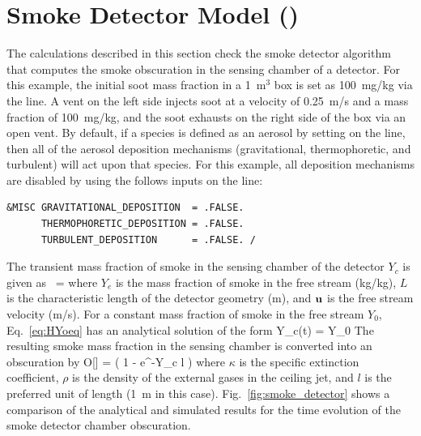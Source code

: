 \documentclass[11pt]{book}
\begin{document}
\clearpage

\section{Smoke Detector Model (\texorpdfstring{}{smoke\_detector}) }
\label{smoke_detector}

The calculations described in this section check the smoke detector algorithm that computes the smoke obscuration in the sensing chamber of a detector. For this example, the initial soot mass fraction in a 1~m$^3$ box is set as 100~mg/kg via the  line. A vent on the left side injects soot at a velocity of 0.25~m/s and a mass fraction of 100~mg/kg, and the soot exhausts on the right side of the box via an open vent. By default, if a species is defined as an aerosol by setting  on the  line, then all of the aerosol deposition mechanisms (gravitational, thermophoretic, and turbulent) will act upon that species. For this example, all deposition mechanisms are disabled by using the follows inputs on the  line:

\begin{lstlisting}
&MISC GRAVITATIONAL_DEPOSITION  = .FALSE.
      THERMOPHORETIC_DEPOSITION = .FALSE.
      TURBULENT_DEPOSITION      = .FALSE. /
\end{lstlisting}

\noindent The transient mass fraction of smoke in the sensing chamber of the detector $Y_c$ is given as~\cite{FDS_Tech_Guide}
\be
{} =  \label{eq:HYoeq}
\ee
where $Y_e$ is the mass fraction of smoke in the free stream (kg/kg), $L$ is the characteristic length of the detector geometry (m), and ${\mathbf{u}}$ is the free stream velocity (m/s). For a constant mass fraction of smoke in the free stream $Y_0$, Eq.~\ref{eq:HYoeq} has an analytical solution of the form
\be
Y_c(t) = Y_0 
\ee
The resulting smoke mass fraction in the sensing chamber is converted into an obscuration by
\be
O[] = \left( 1 - e^{-\kappa \rho Y_c l} \right) 
\ee
where $\kappa$ is the specific extinction coefficient, $\rho$ is the density of the external gases in the ceiling jet,
and $l$ is the preferred unit of length (1~m in this case).
Fig.~\ref{fig:smoke_detector} shows a comparison of the analytical and simulated results for the time evolution of the smoke detector chamber obscuration.
\end{document}
